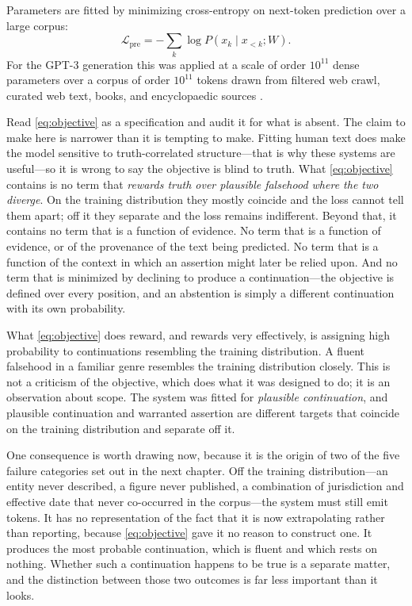 Parameters are fitted by minimizing cross-entropy on next-token prediction over a
large corpus:
\begin{equation}
  \mathcal{L}_{\mathrm{pre}}
  = -\sum_{k} \log P\!\left(x_k \mid x_{<k}; W\right).
  \label{eq:objective}
\end{equation}
For the GPT-3 generation this was applied at a scale of order $10^{11}$ dense
parameters over a corpus of order $10^{11}$ tokens drawn from filtered web crawl,
curated web text, books, and encyclopaedic sources \citep{brown2020}.

Read \eqref{eq:objective} as a specification and audit it for what is absent. The
claim to make here is narrower than it is tempting to make. Fitting human text does
make the model sensitive to truth-correlated structure---that is why these systems are
useful---so it is wrong to say the objective is blind to truth. What
\eqref{eq:objective} contains is no term that \emph{rewards truth over plausible
falsehood where the two diverge}. On the training distribution they mostly coincide
and the loss cannot tell them apart; off it they separate and the loss remains
indifferent. Beyond that, it contains no term that is a function of evidence. No term that is a function of
evidence, or of the provenance of the text being predicted. No term that is a
function of the context in which an assertion might later be relied upon. And no
term that is minimized by declining to produce a continuation---the objective is
defined over every position, and an abstention is simply a different continuation
with its own probability.

What \eqref{eq:objective} does reward, and rewards very effectively, is assigning
high probability to continuations resembling the training distribution. A fluent
falsehood in a familiar genre resembles the training distribution closely. This is
not a criticism of the objective, which does what it was designed to do; it is an
observation about scope. The system was fitted for \emph{plausible continuation},
and plausible continuation and warranted assertion are different targets that
coincide on the training distribution and separate off it.

One consequence is worth drawing now, because it is the origin of two of the
five failure categories set out in the next chapter. Off the training
distribution---an entity never described, a figure never published, a combination
of jurisdiction and effective date that never co-occurred in the corpus---the
system must still emit tokens. It has no representation of the fact that it is now
extrapolating rather than reporting, because \eqref{eq:objective} gave it no
reason to construct one. It produces the most probable continuation, which is
fluent and which rests on nothing. Whether such a continuation happens to be true
is a separate matter, and the distinction
between those two outcomes is far less important than it looks.

